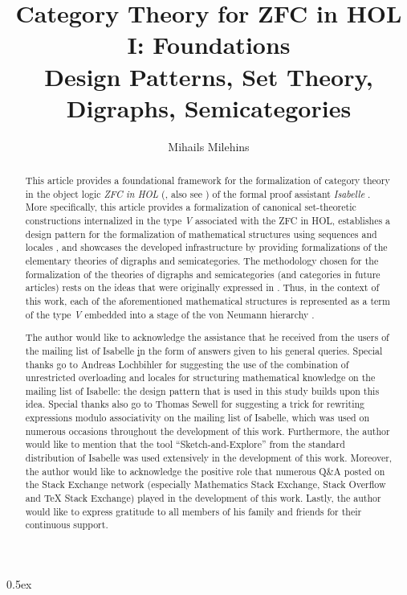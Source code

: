\documentclass[11pt,a4paper,fleqn]{report}
\begin{document}
\title{
Category Theory for ZFC in HOL I: Foundations\\
Design Patterns, Set Theory, Digraphs, Semicategories
} 
\author{Mihails Milehins}
\maketitle

\newpage
\begin{abstract}
This article provides a foundational framework for the formalization 
of category theory in the object logic \textit{ZFC in HOL} 
(\cite{paulson_zermelo_2019}, also see \cite{barkaoui_partizan_2006}) 
of the formal proof assistant \textit{Isabelle} \cite{paulson_natural_1986}.
More specifically, this article 
provides a formalization of canonical set-theoretic constructions
internalized in the type \textit{V} associated with the
ZFC in HOL, establishes a design pattern for the formalization 
of mathematical structures using sequences and locales
\cite{kammuller_locales_1999, berardi_locales_2004, ballarin_tutorial_2020},
and showcases the developed infrastructure by providing formalizations of
the elementary theories of digraphs and semicategories. 
The methodology chosen for the formalization of the theories of
digraphs and semicategories (and categories in future articles) 
rests on the ideas that were originally expressed in 
\cite{feferman_set-theoretical_1969}. Thus, in the context of this work,
each of the aforementioned mathematical structures 
is represented as a term of the type \textit{V} 
embedded into a stage of the von Neumann hierarchy 
\cite{takeuti_introduction_1971}.
\end{abstract}

\newpage

\renewcommand{\abstractname}{Acknowledgements}
\begin{abstract}
The author would like to acknowledge the assistance that he received from 
the users of the mailing list of Isabelle 
\href{https://lists.cam.ac.uk/mailman/listinfo/cl-isabelle-users}
in the form of answers given to his general queries. Special thanks
go to Andreas Lochbihler for suggesting the use of the combination 
of unrestricted overloading and locales for structuring mathematical 
knowledge on the mailing list of Isabelle: the design pattern that is 
used in this study builds upon this idea. Special thanks also go to
Thomas Sewell for suggesting a trick for rewriting 
expressions modulo associativity on the mailing list of Isabelle,
which was used on numerous occasions throughout the development
of this work. Furthermore, the author
would like to mention that the tool ``Sketch-and-Explore''
\cite{haftmann_sketch-and-explore_2021}
from the standard distribution of Isabelle was used extensively in the
development of this work. Moreover, the author would like 
to acknowledge the positive role that numerous Q\&A posted on the 
Stack Exchange network (especially Mathematics Stack Exchange, 
Stack Overflow and TeX Stack Exchange)
played in the development of this work. 
Lastly, the author would like to express gratitude to all members of his family 
and friends for their continuous support.
\end{abstract}

\newpage

\tableofcontents

\newpage

\parindent 0pt\parskip 0.5ex



\newpage


\end{document}
